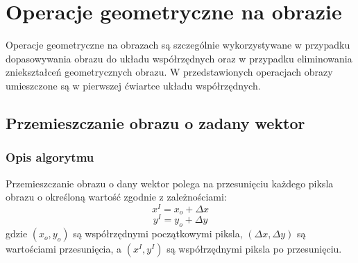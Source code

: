 \documentclass[a4paper,12pt, titlepage]{report}
\begin{document}
\chapter{Operacje geometryczne na obrazie}
Operacje geometryczne na obrazach są szczególnie wykorzystywane w przypadku dopasowywania obrazu do układu współrzędnych oraz w przypadku eliminowania zniekształceń geometrycznych obrazu. W przedstawionych operacjach obrazy umieszczone są w pierwszej ćwiartce układu współrzędnych.
\section{Przemieszczanie obrazu o zadany wektor}
\subsection*{Opis algorytmu}
\par Przemieszczanie obrazu o dany wektor polega na przesunięciu każdego piksla obrazu o określoną wartość zgodnie z zależnościami:\[x^{I}=x_{o}+\Delta x\]\[y^{I}=y_{o}+\Delta y\]gdzie \((x_{o},y_{o})\) są współrzędnymi początkowymi piksla, \((\Delta x,\Delta y)\) są wartościami przesunięcia, a  \((x^{I},y^{I})\) są współrzędnymi piksla po przesunięciu.
\end{document}
